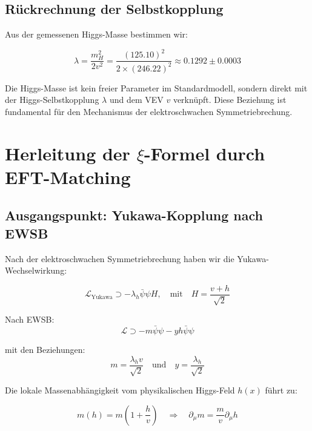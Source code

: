 	\subsection{Rückrechnung der Selbstkopplung}
	
	Aus der gemessenen Higgs-Masse bestimmen wir:
	
	\begin{equation}
		\lambda = \frac{m_H^2}{2v^2} = \frac{(125.10)^2}{2 \times (246.22)^2} \approx 0.1292 \pm 0.0003
	\end{equation}
	
	\begin{wichtig}
		Die Higgs-Masse ist kein freier Parameter im Standardmodell, sondern direkt mit der Higgs-Selbstkopplung $\lambda$ und dem VEV $v$ verknüpft. Diese Beziehung ist fundamental für den Mechanismus der elektroschwachen Symmetriebrechung.
	\end{wichtig}
	
	\section{Herleitung der $\xi$-Formel durch EFT-Matching}
	
	\subsection{Ausgangspunkt: Yukawa-Kopplung nach EWSB}
	
	Nach der elektroschwachen Symmetriebrechung haben wir die Yukawa-Wechselwirkung:
	
	\begin{equation}
		\mathcal{L}_{\text{Yukawa}} \supset -\lambda_h \bar{\psi}\psi H, \quad \text{mit} \quad H = \frac{v + h}{\sqrt{2}}
	\end{equation}
	
	Nach EWSB:
	\begin{equation}
		\mathcal{L} \supset -m \bar{\psi}\psi - y h \bar{\psi}\psi
	\end{equation}
	
	mit den Beziehungen:
	\begin{equation}
		m = \frac{\lambda_h v}{\sqrt{2}} \quad \text{und} \quad y = \frac{\lambda_h}{\sqrt{2}}
	\end{equation}
	
	Die lokale Massenabhängigkeit vom physikalischen Higgs-Feld $h(x)$ führt zu:
	
	\begin{equation}
		m(h) = m\left(1 + \frac{h}{v}\right) \quad \Rightarrow \quad \partial_\mu m = \frac{m}{v}\partial_\mu h
	\end{equation}
	
